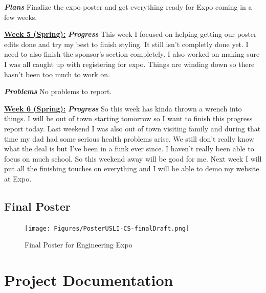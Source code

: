 \documentclass[onecolumn, draftclsnofoot, 10pt, compsoc]{IEEEtran}
\begin{document}
\textbf{\textit{{Plans}}}
\newline Finalize the expo poster and get everything ready for Expo coming in a few weeks. \newline 

\underline{\textbf{Week 5 (Spring):}}
\newline\textbf{\textit{{Progress}}}
\newline This week I focused on helping getting our poster edits done and try my best to finish styling. It still isn't completly done yet. I need to also finish the sponsor's section completely. I also worked on making sure I was all caught up with registering for expo. Things are winding down so there hasn't been too much to work on. 

\textbf{\textit{{Problems}}}
\newline No problems to report. \newline 

\underline{\textbf{Week 6 (Spring):}}
\newline\textbf{\textit{{Progress}}}
\newline So this week has kinda thrown a wrench into things. I will be out of town starting tomorrow so I want to finish this progress report today. Last weekend I was also out of town visiting family and during that time my dad had some serious health problems arise. We still don't really know what the deal is but I've been in a funk ever since. I haven't really been able to focus on much school. So this weekend away will be good for me. Next week I will put all the finishing touches on everything and I will be able to demo my website at Expo. \newline 

\newpage
\begin{landscape}
\section{Final Poster}
\vspace{1cm}
\begin{figure}[ht]
    \centering
    \texttt{[image: Figures/PosterUSLI-CS-finalDraft.png]}
    \caption{Final Poster for Engineering Expo}
    \label{fig:my_label}
\end{figure}
\end{landscape}


\newpage
\section{Project Documentation}
\end{document}
